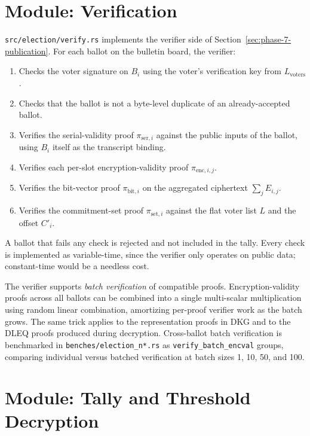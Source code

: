 \documentclass[12pt,a4paper,oneside]{report}
\begin{document}
\section{Module: Verification}
\label{sec:impl-verification}

\texttt{src/election/verify.rs} implements the verifier side of 
Section~\ref{sec:phase-7-publication}. For each ballot on the bulletin 
board, the verifier:

\begin{enumerate}
    \item Checks the voter signature on $B_i$ using the voter's 
    verification key from $L_{\text{voters}}$.
    \item Checks that the ballot is not a byte-level duplicate of an 
    already-accepted ballot.
    \item Verifies the serial-validity proof $\pi_{\text{ser}, i}$ 
    against the public inputs of the ballot, using $B_i$ itself as the 
    transcript binding.
    \item Verifies each per-slot encryption-validity proof 
    $\pi_{\text{enc}, i, j}$.
    \item Verifies the bit-vector proof $\pi_{\text{bit}, i}$ on the 
    aggregated ciphertext $\sum_j E_{i, j}$.
    \item Verifies the commitment-set proof $\pi_{\text{set}, i}$ 
    against the flat voter list $L$ and the offset $C'_i$.
\end{enumerate}

A ballot that fails any check is rejected and not included in the tally. 
Every check is implemented as variable-time, since the verifier only 
operates on public data; constant-time would be a needless cost.

The verifier supports \emph{batch verification} of compatible proofs. 
Encryption-validity proofs across all ballots can be combined into a 
single multi-scalar multiplication using random linear combination, 
amortizing per-proof verifier work as the batch grows. The same trick 
applies to the representation proofs in DKG and to the DLEQ proofs 
produced during decryption. Cross-ballot batch verification is 
benchmarked in \texttt{benches/election\_n*.rs} as 
\texttt{verify\_batch\_encval} groups, comparing individual versus 
batched verification at batch sizes 1, 10, 50, and 100.

\section{Module: Tally and Threshold Decryption}
\label{sec:impl-tally}
\end{document}
